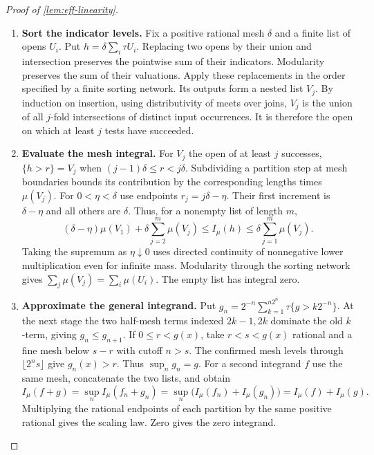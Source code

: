\documentclass[11pt,a4paper]{article}
\theoremstyle{definition}
\theoremstyle{remark}\newaliascnt{remark}{theorem}
\numberwithin{equation}{section}
\begin{document}
\begin{proof}[Proof of \cref{lem:eff-linearity}]\leavevmode
\begin{enumerate}[titledsteps]
    \item \textbf{Sort the indicator levels.} Fix a positive rational mesh $\delta$ and a finite list of opens $U_i$. Put $h=\delta\sum_i\tau U_i$. Replacing two opens by their union and intersection preserves the pointwise sum of their indicators. Modularity preserves the sum of their valuations. Apply these replacements in the order specified by a finite sorting network. Its outputs form a nested list $V_j$. By induction on insertion, using distributivity of meets over joins, $V_j$ is the union of all $j$-fold intersections of distinct input occurrences. It is therefore the open on which at least $j$ tests have succeeded.


    \item \textbf{Evaluate the mesh integral.} For \(V_j\) the open of at least \(j\) successes, \(\{h>r\}=V_j\) when \((j-1)\delta\le r<j\delta\). Subdividing a partition step at mesh boundaries bounds its contribution by the corresponding lengths times \(\mu(V_j)\). For \(0<\eta<\delta\) use endpoints \(r_j=j\delta-\eta\). Their first increment is \(\delta-\eta\) and all others are \(\delta\). Thus, for a nonempty list of length \(m\),
\[
 (\delta-\eta)\mu(V_1)+\delta\sum_{j=2}^m\mu(V_j)
 \le I_\mu(h)\le\delta\sum_{j=1}^m\mu(V_j).
\]
Taking the supremum as \(\eta\downarrow0\) uses directed continuity of nonnegative lower multiplication even for infinite mass. Modularity through the sorting network gives \(\sum_j\mu(V_j)=\sum_i\mu(U_i)\). The empty list has integral zero.


    \item \textbf{Approximate the general integrand.} Put \(g_n=2^{-n}\sum_{k=1}^{n2^n}\tau\{g>k2^{-n}\}\). At the next stage the two half-mesh terms indexed \(2k-1,2k\) dominate the old \(k\)-term, giving \(g_n\le g_{n+1}\). If \(0\le r<g(x)\), take \(r<s<g(x)\) rational and a fine mesh below \(s-r\) with cutoff \(n>s\). The confirmed mesh levels through \(\lfloor 2^n s\rfloor\) give \(g_n(x)>r\). Thus \(\sup_n g_n=g\). For a second integrand \(f\) use the same mesh, concatenate the two lists, and obtain
\[
 I_\mu(f+g)=\sup_n I_\mu(f_n+g_n)
           =\sup_n\bigl(I_\mu(f_n)+I_\mu(g_n)\bigr)= I_\mu(f)+I_\mu(g).
\]
Multiplying the rational endpoints of each partition by the same positive rational gives the scaling law. Zero gives the zero integrand.\qedhere

\end{enumerate}
\end{proof}
\end{document}
